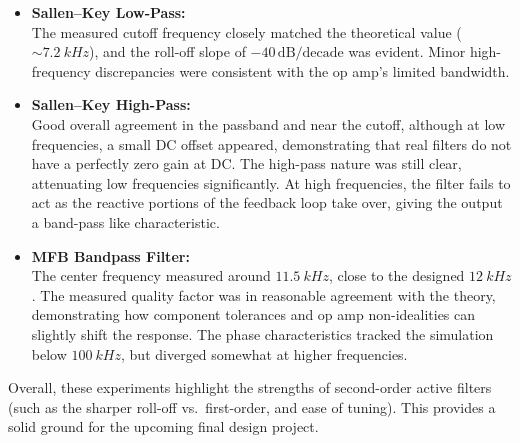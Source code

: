 \documentclass[12pt]{article}
\begin{document}
\begin{itemize}

	\item \textbf{Sallen--Key Low-Pass:}\\
	      The measured cutoff frequency closely matched the theoretical value
	      ($\sim\SI{7.2}{kHz}$), and the roll-off slope of $-40\,\mathrm{dB/decade}$ was
	      evident. Minor high-frequency discrepancies were consistent with the op amp’s
	      limited bandwidth.

	\item \textbf{Sallen--Key High-Pass:}\\
	      Good overall agreement in the passband and near the cutoff, although
	      at low frequencies, a small DC offset appeared, demonstrating that real filters
	      do not have a perfectly zero gain at DC. The high-pass nature was still clear,
	      attenuating low frequencies significantly. At high frequencies, the filter fails
	      to act as the reactive portions of the feedback loop take over, giving the
	      output a band-pass like characteristic.

	\item \textbf{MFB Bandpass Filter:}\\
	      The center frequency measured around $\SI{11.5}{kHz}$, close to the designed
	      $\SI{12}{kHz}$. The measured quality factor was in reasonable agreement with the
	      theory, demonstrating how component tolerances and op amp non-idealities can
	      slightly shift the response. The phase characteristics tracked the simulation
	      below $\SI{100}{kHz}$, but diverged somewhat at higher frequencies.
\end{itemize}

Overall, these experiments highlight the strengths of second-order active
filters (such as the sharper roll-off vs.\ first-order, and ease of tuning).
This provides a solid ground for the upcoming final design project.
\end{document}
